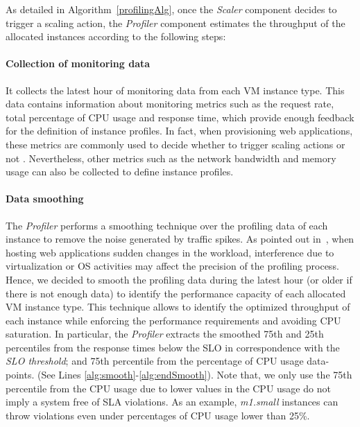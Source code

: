 As detailed in Algorithm~\ref{profilingAlg}, once the \emph{Scaler} component decides to trigger a scaling action, the \emph{Profiler} component estimates the throughput of the allocated instances according to the following steps:



\paragraph{Collection of monitoring data} It collects the latest hour of monitoring data from each VM instance type. This data contains information about monitoring metrics such as the request rate, total percentage of CPU usage and response time, which provide enough feedback for the definition of instance profiles. In fact, when provisioning web applications, these metrics are commonly used to decide whether to trigger scaling actions or not \cite{smartscale_2012,urgaonkar_agile_2008}. Nevertheless, other metrics such as the network bandwidth and memory usage can also be collected to define instance profiles.


\paragraph{Data smoothing} The \emph{Profiler} performs a smoothing technique over the profiling data of each instance to remove the noise generated by traffic spikes. As pointed out in~\cite{gandhi_hybrid_2012}, when hosting web applications sudden changes in the workload, interference due to virtualization or OS activities may affect the precision of the profiling process. Hence, we decided to smooth the profiling data during the latest hour (or older if there is not enough data) to identify the performance capacity of each allocated VM instance type. This technique allows to identify the optimized throughput of each instance while enforcing the performance requirements and avoiding CPU saturation. In particular, the \emph{Profiler} extracts the smoothed 75th and 25th percentiles from the response times below the SLO in correspondence with the \emph{SLO threshold}; and 75th percentile from the percentage of CPU usage data-points. (See Lines \ref{alg:smooth}-\ref{alg:endSmooth}). Note that, we only use the 75th percentile from the CPU usage due to lower values in the CPU usage do not imply a system free of SLA violations. As an example, \emph{m1.small} instances can throw violations even under percentages of CPU usage lower than 25\%. 


